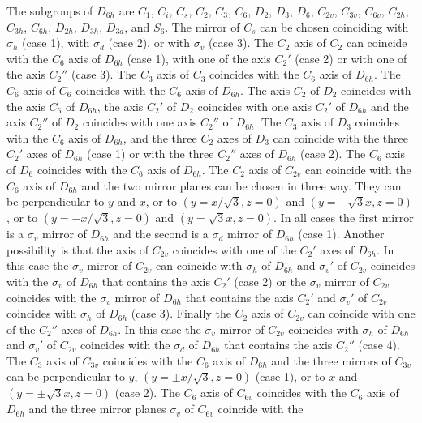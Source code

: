 \documentclass[12pt,a4paper]{article}
\begin{document}
The subgroups of $D_{6h}$ are $C_1$, $C_i$, $C_s$, $C_2$, $C_3$, $C_6$,
$D_2$, $D_3$, $D_6$, $C_{2v}$, $C_{3v}$, $C_{6v}$, $C_{2h}$, $C_{3h}$, 
$C_{6h}$, $D_{2h}$, $D_{3h}$, $D_{3d}$, and $S_6$. 
The mirror of $C_s$ can be chosen coinciding with $\sigma_h$ (case 1), 
with $\sigma_d$ (case 2), or with $\sigma_v$ (case 3). The $C_2$ axis of 
$C_2$ can coincide with the $C_6$ axis of $D_{6h}$ (case 1), with one 
of the axis $C_2'$ (case 2) or with one of the axis
$C_2''$ (case 3). The $C_3$ axis of $C_3$ coincides with the $C_6$ axis of 
$D_{6h}$. The $C_6$ axis of $C_6$ coincides with the $C_6$ axis of 
$D_{6h}$. The axis $C_2$ of $D_2$ coincides with the axis $C_6$ of $D_{6h}$,
the axis $C_2'$ of $D_2$ coincides with one axis $C_2'$ of $D_{6h}$ and
the axis $C_2''$ of $D_2$ coincides with one axis $C_2''$ of $D_{6h}$.
The $C_3$ axis of $D_3$ coincides with the $C_6$ axis of $D_{6h}$, and
the three $C_2$ axes of $D_3$ can coincide with the three $C_2'$ axes of
$D_{6h}$ (case 1) or with the three $C_2''$ axes of $D_{6h}$ (case 2). 
The $C_6$ axis of $D_6$ coincides with the $C_6$ axis of $D_{6h}$. The $C_2$ 
axis of $C_{2v}$ can coincide with the $C_6$ axis of $D_{6h}$ and the two 
mirror planes can be chosen in three way. They can be perpendicular to $y$ and $x$, 
or to $(y=x/\sqrt{3}, z=0)$ and $(y=-\sqrt{3} x, z=0)$, or to
$(y=-x/\sqrt{3}, z=0)$ and $(y=\sqrt{3} x, z=0)$. In all cases 
the first mirror is a $\sigma_v$ mirror of $D_{6h}$ and the
second is a $\sigma_d$ mirror of $D_{6h}$ (case 1). 
Another possibility is that the axis of $C_{2v}$ coincides
with one of the $C_2'$ axes of $D_{6h}$. In this case the $\sigma_v$ mirror
of $C_{2v}$ can coincide with $\sigma_h$ of $D_{6h}$ and 
$\sigma_v'$ of $C_{2v}$ coincides with the $\sigma_v$ of $D_{6h}$ 
that contains the axis $C_2'$ (case 2) or the $\sigma_v$ mirror
of $C_{2v}$ coincides with the $\sigma_v$ mirror of $D_{6h}$ 
that contains the axis $C_2'$ and $\sigma_v'$ of $C_{2v}$ coincides 
with $\sigma_h$ of $D_{6h}$ (case 3). 
Finally the $C_2$ axis of $C_{2v}$ can coincide
with one of the $C_2''$ axes of $D_{6h}$. In this case the $\sigma_v$ mirror of
$C_{2v}$ coincides with $\sigma_h$ of $D_{6h}$ and $\sigma_v'$ of
$C_{2v}$ coincides with the $\sigma_d$ of $D_{6h}$ that contains the axis 
$C_2''$ (case 4). The $C_3$ axis of $C_{3v}$ coincides with the $C_6$ axis of
$D_{6h}$ and the three mirrors of $C_{3v}$ can be perpendicular to $y$, 
$(y=\pm x/\sqrt{3}, z=0)$ (case 1), or to $x$ and $(y=\pm \sqrt{3} x, z=0)$
(case 2). The $C_6$ axis of $C_{6v}$ coincides with the $C_6$ axis of
$D_{6h}$ and the three mirror planes $\sigma_v$ of $C_{6v}$ coincide with the
\end{document}
